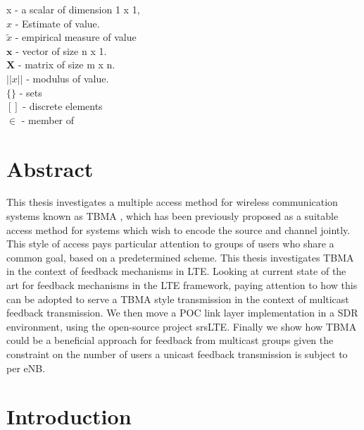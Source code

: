 \documentclass{article}
\begin{document}
x - a scalar of dimension 1 x 1, \\
$\hat{x}$ - Estimate of value.\\
$\tilde{x}$ - empirical measure of value \\
$\boldsymbol{x}$ - vector of size n x 1.\\ 
$\boldsymbol{X}$ - matrix of size m x n.\\ 
$||x||$ - modulus of value. \\
$\{\}$ - sets \\
$[]$ - discrete elements \\  
$\in$ - member of \\



\newpage

\section*{Abstract}
This thesis investigates a multiple access method for wireless communication systems known as \ac{TBMA} \cite{tbma}, which has been previously proposed as a suitable access method for systems which wish to encode the source and channel jointly. This style of access pays particular attention to groups of users who share a common goal, based on a predetermined scheme. This thesis investigates \ac{TBMA} in the context of feedback mechanisms in \ac{LTE}. Looking at current state of the art for feedback mechanisms in the LTE framework, paying attention to how this can be adopted to serve a \ac{TBMA} style transmission in the context of multicast feedback transmission. We then move a \ac{POC} link layer implementation in a \ac{SDR} environment, using the open-source project srsLTE. Finally we show how TBMA could be a beneficial approach for feedback from multicast groups given the constraint on the number of users a unicast feedback transmission is subject to per \ac{eNB}.  
\newpage

\section{Introduction}\label{intro}
\end{document}

